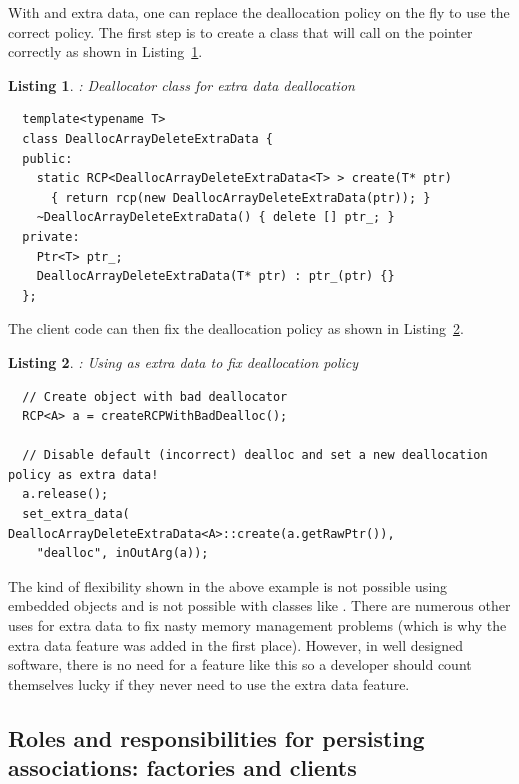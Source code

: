 \documentclass[pdf,ps2pdf,11pt]{SANDreport}
\newtheorem{listing}{Listing}
\begin{document}
With {} and extra data, one can replace the deallocation
policy on the fly to use the correct policy.  The first step is to
create a class that will call {} on the pointer
correctly as shown in Listing~\ref{listing:DeallocArrayDeleteExtraData}.


\begin{listing}: Deallocator class for extra data deallocation \\
\label{listing:DeallocArrayDeleteExtraData}
{\small\begin{verbatim}
  template<typename T>
  class DeallocArrayDeleteExtraData {
  public:
    static RCP<DeallocArrayDeleteExtraData<T> > create(T* ptr)
      { return rcp(new DeallocArrayDeleteExtraData(ptr)); }
    ~DeallocArrayDeleteExtraData() { delete [] ptr_; }
  private:
    Ptr<T> ptr_;
    DeallocArrayDeleteExtraData(T* ptr) : ptr_(ptr) {}
  };
\end{verbatim}}
\end{listing}


The client code can then fix the deallocation policy as shown in
Listing~\ref{listing:using-DeallocArrayDeleteExtraData}.


{}\begin{listing}: Using {} as extra
data to fix deallocation policy
\label{listing:using-DeallocArrayDeleteExtraData}
{\small\begin{verbatim}
  // Create object with bad deallocator
  RCP<A> a = createRCPWithBadDealloc();

  // Disable default (incorrect) dealloc and set a new deallocation policy as extra data!
  a.release();
  set_extra_data( DeallocArrayDeleteExtraData<A>::create(a.getRawPtr()),
    "dealloc", inOutArg(a));
\end{verbatim}}
\end{listing}


The kind of flexibility shown in the above example is not possible
using embedded objects and is not possible with classes like
{}.  There are numerous other uses for extra
data to fix nasty memory management problems (which is why the extra
data feature was added in the first place).  However, in well designed
software, there is no need for a feature like this so a developer
should count themselves lucky if they never need to use the extra data
feature.


%
{}\subsection{Roles and responsibilities for persisting associations:
factories and clients}
\label{sec:roles-and-responsibilities}
%
\end{document}
